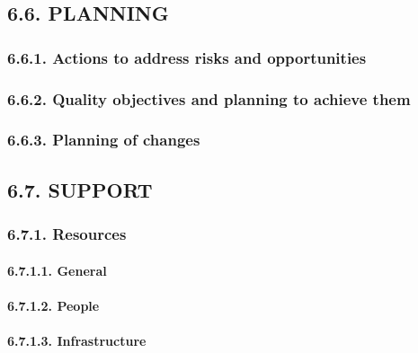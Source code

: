 \documentclass[
]{article}
\begin{document}
\hypertarget{planning}{%
\subsection{6.6. PLANNING}\label{planning}}

\hypertarget{actions-to-address-risks-and-opportunities}{%
\subsubsection{6.6.1. Actions to address risks and
opportunities}\label{actions-to-address-risks-and-opportunities}}

\hypertarget{quality-objectives-and-planning-to-achieve-them}{%
\subsubsection{6.6.2. Quality objectives and planning to achieve
them}\label{quality-objectives-and-planning-to-achieve-them}}

\hypertarget{planning-of-changes}{%
\subsubsection{6.6.3. Planning of changes}\label{planning-of-changes}}

\hypertarget{support}{%
\subsection{6.7. SUPPORT}\label{support}}

\hypertarget{resources}{%
\subsubsection{6.7.1. Resources}\label{resources}}

\hypertarget{general-1}{%
\paragraph{6.7.1.1. General}\label{general-1}}

\hypertarget{people}{%
\paragraph{6.7.1.2. People}\label{people}}

\hypertarget{infrastructure}{%
\paragraph{6.7.1.3. Infrastructure}\label{infrastructure}}
\end{document}
